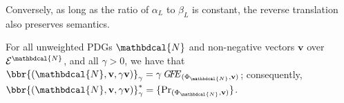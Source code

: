 \documentclass[letterpaper]{article} %
\theoremstyle{plain}
\theoremstyle{definition}
\theoremstyle{remark}
\newcommand{\begthm}[3][]{\begin{#2}[{name=#1},restate=#3,label=#3]}
\newcommand\mat[1]{\mathbf{#1}}
\newcommand{\Ed}{\mathcal E}
\newcommand{\dg}[1]{\mathbdcal{#1}}
\newcommand\GFE{\mathit{G\mkern-4mu F\mkern-4.5mu E}}
\begin{document}
Conversely, as long as the ratio of $\alpha_L$ to $\beta_L$ is constant, the
reverse translation also preserves semantics.
\begthm{theorem}{thm:pdg-is-wfg}
For all unweighted PDGs $\dg{N}$ and non-negative vectors $\mat v$
over $\Ed^{\dg N}$, and all $\gamma > 0$, we have that 
$\bbr{(\dg N, \mat v, \gamma \mat v)}_{\gamma}
= \gamma\,\GFE_{(\Phi_{\dg N}, \mat v)} $; consequently,
$\bbr{(\dg N,  \mat v,  \gamma\mat v)}_{\gamma}^*
		= \{\Pr_{(\Phi_{\dg N}, \mat v)} \}$. 
\end{theorem}

\end{document}
